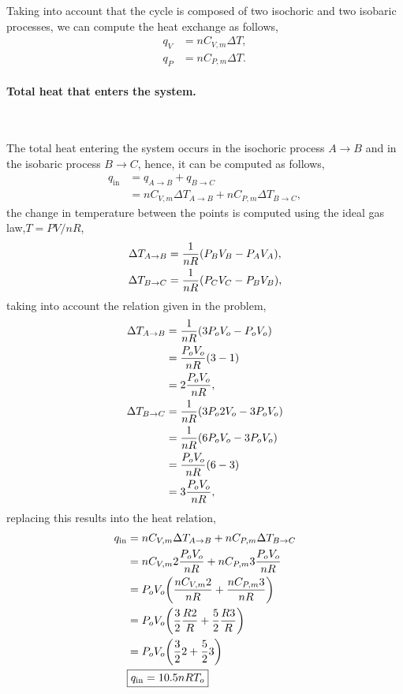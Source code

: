 \documentclass[main.tex]{subfiles}
\begin{document}
Taking into account that the cycle is composed of two isochoric and two isobaric processes, we can compute the heat exchange as follows,
\begin{align*}
    q_V &= nC_{V,m}\Delta T, \\
    q_P &= nC_{P,m}\Delta T.
\end{align*}

\paragraph{Total heat that enters the system.}~

The total heat entering the system occurs in the isochoric process $A\to B$ and in the isobaric process $B \to C$, hence, it can be computed as follows,
\begin{align*}
    q_{\mathrm{in}} &= q_{A\to B} + q_{B\to C} \\
    &= nC_{V,m}\Delta T_{A\to B} + nC_{P,m}\Delta T_{B\to C},
\end{align*}
the change in temperature between the points is computed using the ideal gas law,$T=PV/nR$,
\begin{align*}
    \Delta T_{A\to B} &= \frac{1}{nR}\qty(P_BV_B-P_AV_A), \\
    \Delta T_{B\to C} &= \frac{1}{nR}\qty(P_CV_C-P_BV_B),
\end{align*}
taking into account the relation given in the problem,
\begin{align*}
    \Delta T_{A\to B} &= \frac{1}{nR}\qty(3P_oV_o-P_oV_o) \\
    &= \frac{P_oV_o}{nR}\qty(3-1) \\
    &= 2\frac{P_oV_o}{nR}, \\
    \Delta T_{B\to C} &= \frac{1}{nR}\qty(3P_o2V_o-3P_oV_o) \\
    &= \frac{1}{nR}\qty(6P_oV_o-3P_oV_o) \\
    &= \frac{P_oV_o}{nR}\qty(6-3) \\
    &= 3\frac{P_oV_o}{nR},
\end{align*}
replacing this results into the heat relation,
\begin{align*}
    q_{\mathrm{in}} &= nC_{V,m}\Delta T_{A\to B} + nC_{P,m}\Delta T_{B\to C} \\
    &= nC_{V,m}2\frac{P_oV_o}{nR} + nC_{P,m}3\frac{P_oV_o}{nR} \\
    &= P_oV_o\qty(\frac{nC_{V,m}2}{nR} + \frac{nC_{P,m}3}{nR}) \\
    &= P_oV_o\qty(\frac{3}{2}\frac{R2}{R} + \frac{5}{2}\frac{R3}{R}) \\
    &= P_oV_o\qty(\frac{3}{2}2 + \frac{5}{2}3) \\
    &\begin{gathered}
        \boxed{q_{\mathrm{in}} =  10.5nRT_o}
    \end{gathered}
\end{align*}
\end{document}
